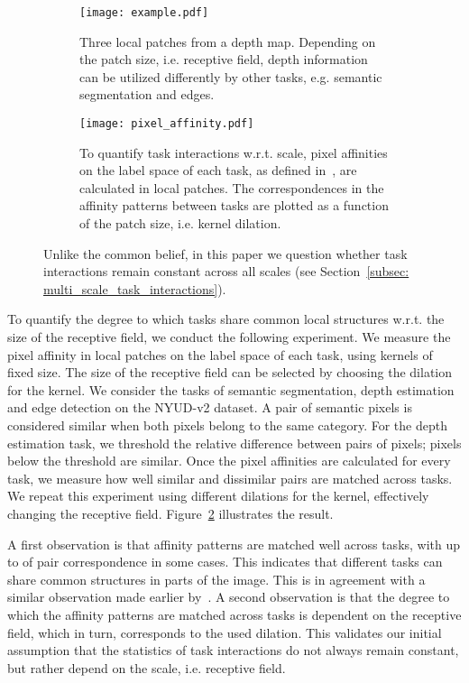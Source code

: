 \documentclass[runningheads]{llncs}
\begin{document}
\begin{figure}[t]
\centering
\begin{subfigure}{.39\linewidth}
  \centering
  \texttt{[image: example.pdf]}
  \caption{Three local patches from a depth map. Depending on the patch size, i.e. receptive field, depth information can be utilized differently by other tasks, e.g. semantic segmentation and edges.}
  \label{fig: intuitive}
\end{subfigure}\hspace*{.03\linewidth}
\begin{subfigure}{.53\linewidth}
  \centering
  \texttt{[image: pixel\_affinity.pdf]}
  \caption{To quantify task interactions w.r.t. scale, pixel affinities on the label space of each task, as defined in~\cite{zhang2019pattern}, are calculated in local patches. The correspondences in the affinity patterns between tasks are plotted as a function of the patch size, i.e. kernel dilation.}
  \label{fig: affinity}
\end{subfigure}
\caption{Unlike the common belief, in this paper we question whether task interactions remain constant across all scales (see Section~\ref{subsec: multi_scale_task_interactions}).}
\label{fig: task_interactions}
\end{figure}

To quantify the degree to which tasks share common local structures w.r.t. the size of the receptive field, we conduct the following experiment. We measure the pixel affinity in local patches on the label space of each task, using kernels of fixed size. The size of the receptive field can be selected by choosing the dilation for the kernel. We consider the tasks of semantic segmentation, depth estimation and edge detection on the NYUD-v2 dataset. A pair of semantic pixels is considered similar when both pixels belong to the same category. For the depth estimation task, we threshold the relative difference between pairs of pixels; pixels below the threshold are similar. Once the pixel affinities are calculated for every task, we measure how well similar and dissimilar pairs are matched across tasks. We repeat this experiment using different dilations for the kernel, effectively changing the receptive field. Figure~\ref{fig: affinity} illustrates the result.

A first observation is that affinity patterns are matched well across tasks, with up to  of pair correspondence in some cases. This indicates that different tasks can share common structures in parts of the image. This is in agreement with a similar observation made earlier by~\cite{zhang2019pattern}. A second observation is that the degree to which the affinity patterns are matched across tasks is dependent on the receptive field, which in turn, corresponds to the used dilation. This validates our initial assumption that the statistics of task interactions do not always remain constant, but rather depend on the scale, i.e. receptive field. 
\end{document}
